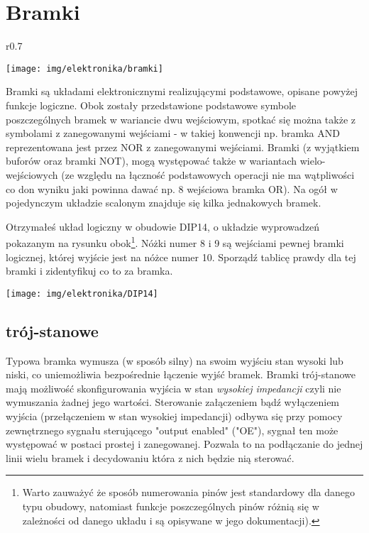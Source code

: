 \documentclass{pdfBooklets}
\begin{document}
\teacher{\newpage}

\section{Bramki}
\begin{wrapfigure}{r}{0.7\textwidth}
  \begin{center}
    \vspace{-40pt}
    \texttt{[image: img/elektronika/bramki]}
    \vspace{-20pt}
  \end{center}
\end{wrapfigure}

Bramki są układami elektronicznymi realizującymi podstawowe, opisane powyżej funkcje logiczne. Obok zostały przedstawione podstawowe symbole poszczególnych bramek w wariancie dwu wejściowym, spotkać się można także z symbolami z zanegowanymi wejściami - w takiej konwencji np. bramka AND reprezentowana jest przez NOR z zanegowanymi wejściami. Bramki (z wyjątkiem buforów oraz bramki NOT), mogą występować także w wariantach wielo-wejściowych (ze względu na łączność podstawowych operacji nie ma wątpliwości co don wyniku jaki powinna dawać np. 8 wejściowa bramka OR). Na ogół w pojedynczym układzie scalonym znajduje się kilka jednakowych bramek.

\begin{Zadanie}{}{}
\noindent\begin{minipage}[t]{\textwidth}
	\noindent\parbox[b]{0.7\textwidth}{
		Otrzymałeś układ logiczny w obudowie DIP14, o układzie wyprowadzeń pokazanym na rysunku obok\footnote{
			Warto zauważyć że sposób numerowania pinów jest standardowy dla danego typu obudowy, natomiast funkcje poszczególnych pinów różnią się w zależności od danego układu i są opisywane w jego dokumentacji).
		}.
		Nóżki numer 8 i 9 są wejściami pewnej bramki logicznej, której wyjście jest na nóżce numer 10. Sporządź tablicę prawdy dla tej bramki i zidentyfikuj co to za bramka.
		\vspace{0.25cm}
	}\hfill\parbox[b]{0.25\textwidth}{
		\texttt{[image: img/elektronika/DIP14]}
		\vspace{-0.5cm}
	}
\end{minipage}
\end{Zadanie}

\subsection{trój-stanowe}
Typowa bramka wymusza (w sposób silny) na swoim wyjściu stan wysoki lub niski, co uniemożliwia bezpośrednie łączenie wyjść bramek.
Bramki trój-stanowe mają możliwość skonfigurowania wyjścia w stan \emph{wysokiej impedancji} czyli nie wymuszania żadnej jego wartości.
Sterowanie załączeniem bądź wyłączeniem wyjścia (przełączeniem w stan wysokiej impedancji) odbywa się przy pomocy zewnętrznego sygnału sterującego "output enabled" ("OE"), sygnał ten może występować w postaci prostej i zanegowanej.
Pozwala to na podłączanie do jednej linii wielu bramek i decydowaniu która z nich będzie nią sterować.
\end{document}

